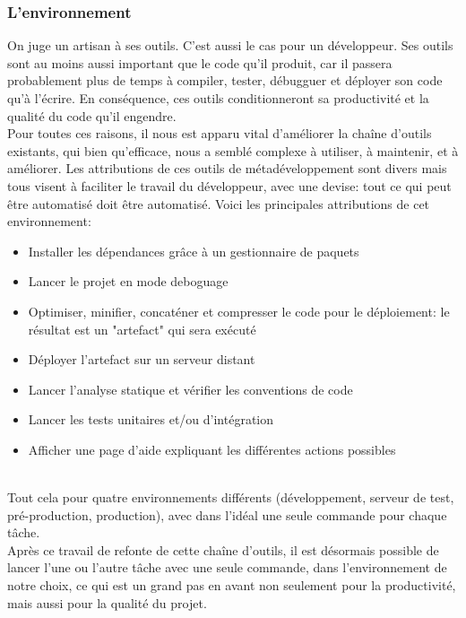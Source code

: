 \documentclass[a4paper,french,12pt]{article}
\begin{document}
	\subsubsection{L'environnement}
	
	On juge un artisan à ses outils. C'est aussi le cas pour un développeur. 	Ses outils sont au moins aussi important que le code qu'il produit, car il passera probablement plus de temps à compiler, tester, débugguer et déployer son code qu'à l'écrire. En conséquence, ces outils conditionneront
	sa productivité et la qualité du code qu'il engendre.~\\	
	
	Pour toutes ces raisons, il nous est apparu vital d'améliorer la chaîne d'outils existants, qui bien qu'efficace, nous a semblé complexe à utiliser, à maintenir, et à améliorer. Les attributions de ces outils de métadéveloppement sont divers mais tous visent à faciliter le travail du développeur, avec une devise: tout ce qui peut être automatisé doit être automatisé.
	Voici les principales attributions de cet environnement: ~\\
	
	\begin{itemize}
		\item Installer les dépendances grâce à un gestionnaire de paquets
		\item Lancer le projet en mode deboguage
		\item Optimiser, minifier, concaténer et compresser le code pour le déploiement: le résultat est un "artefact" qui sera exécuté
		\item Déployer l'artefact sur un serveur distant
		\item Lancer l'analyse statique et vérifier les conventions de code
		\item Lancer les tests unitaires et/ou d'intégration
		\item Afficher une page d'aide expliquant les différentes actions possibles
	\end{itemize}	 ~\\
	
	Tout cela pour quatre environnements différents (développement, serveur de test, pré-production, production), avec dans l'idéal une seule commande pour chaque tâche.~\\	
	
	Après ce travail de refonte de cette chaîne d'outils, il est désormais possible de lancer l'une ou l'autre tâche avec une seule commande, dans l'environnement de notre choix, ce qui est un grand pas en avant non seulement pour la productivité, mais aussi pour la qualité du projet. ~\\	
	
\end{document}
